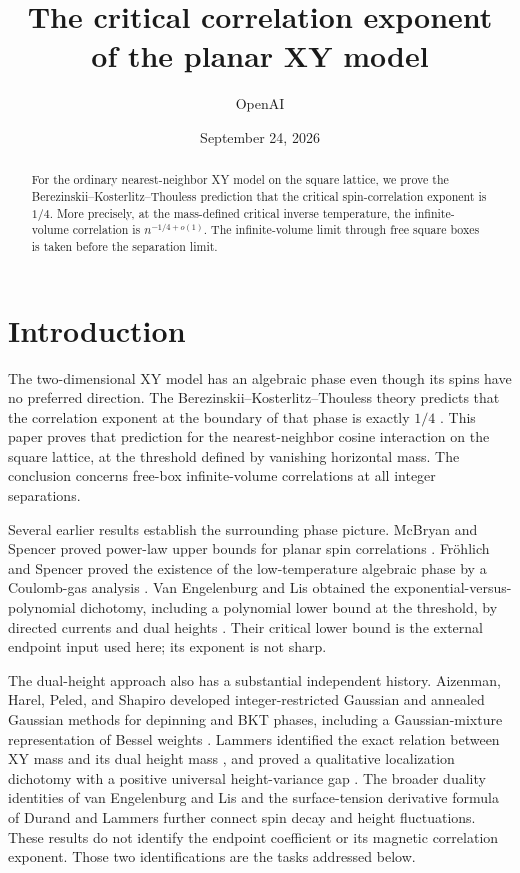 \documentclass[11pt]{article}
\title{The critical correlation exponent\\of the planar XY model}
\author{OpenAI}
\date{September 24, 2026}
\numberwithin{equation}{section}
\theoremstyle{definition}
\theoremstyle{remark}
\begin{document}
\maketitle
\begin{abstract}
For the ordinary nearest-neighbor XY model on the square lattice,
we prove the Berezinskii--Kosterlitz--Thouless prediction that the
critical spin-correlation exponent is \(1/4\). More precisely, at
the mass-defined critical inverse temperature, the infinite-volume
correlation is \(n^{-1/4+o(1)}\). The infinite-volume limit through
free square boxes is taken before the separation limit.
\end{abstract}

\section{Introduction}
The two-dimensional XY model has an algebraic phase even though
its spins have no preferred direction.  The
Berezinskii--Kosterlitz--Thouless theory predicts that the
correlation exponent at the boundary of that phase is exactly
\(1/4\) \cite{Berezinskii,BKT1973,Kosterlitz1974}.  This paper
proves that prediction for the nearest-neighbor cosine interaction
on the square lattice, at the threshold defined by vanishing
horizontal mass.  The conclusion concerns free-box
infinite-volume correlations at all integer separations.

Several earlier results establish the surrounding phase picture.
McBryan and Spencer proved power-law upper bounds for planar
spin correlations \cite{McBryanSpencer1977}. Fr\"ohlich and
Spencer proved the existence of the low-temperature algebraic
phase by a Coulomb-gas analysis \cite{FS}. Van Engelenburg and
Lis obtained the exponential-versus-polynomial dichotomy, including
a polynomial lower bound at the threshold, by directed currents
and dual heights \cite{vEL}.  Their critical lower bound is the
external endpoint input used here; its exponent is not sharp.

The dual-height approach also has a substantial independent
history. Aizenman, Harel, Peled, and Shapiro developed
integer-restricted Gaussian and annealed Gaussian methods for
depinning and BKT phases, including a Gaussian-mixture
representation of Bessel weights \cite{AHPS2022}.
Lammers identified the exact relation between XY mass and its
dual height mass \cite{LammersBijecting2023}, and proved a
qualitative localization dichotomy with a positive universal
height-variance gap \cite{LammersDichotomy2026}.  The broader
duality identities of van Engelenburg and Lis
\cite{vanEngelenburgLisDuality2025} and the surface-tension
derivative formula of Durand and Lammers \cite{DurandLammers2026}
further connect spin decay and height fluctuations. These results
do not identify the endpoint coefficient or its magnetic
correlation exponent. Those two identifications are the tasks
addressed below.
\end{document}
